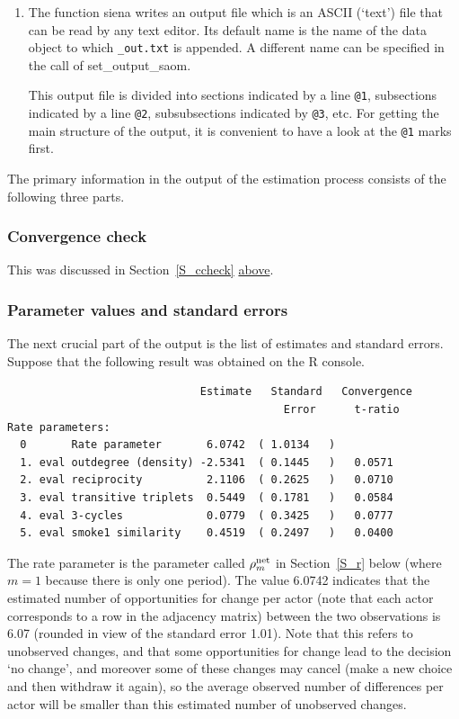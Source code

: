 \documentclass[a4paper,fleqn,11pt]{article}
\newcommand{\+}{\, + \,}
\newcommand{\sfn}[1]{\textsf{#1}}
\newcommand{\R}{{\sf R }}
\begin{document}
\begin{enumerate}
  \item The function \textsf{siena}
        writes an output file which is an ASCII (`text') file that can be
        read by any text editor.
        Its default name is the name of the data object
         to which \texttt{\_out.txt} is appended. A different name
        can be specified in the call of \textsf{\sfn{set\_output\_saom}}.

        This output file is divided into sections
        indicated by a line {\tt @1},
        subsections indicated by a line {\tt @2}, subsubsections indicated
        by {\tt @3}, etc. For getting the main structure of the output, it
        is convenient to have a look at the {\tt @1} marks first.
\end{enumerate}

The primary information in the output of the estimation process
consists of the following three parts.

\subsubsection{Convergence check}

This was discussed in Section~\ref{S_ccheck} \hyperlink{T_convergence}{above}.
\medskip

\subsubsection{Parameter values and standard errors}

The next crucial part of the output is the list of estimates and
standard errors. Suppose that the
following result was obtained on the \R console.

{\footnotesize
\begin{verbatim}
                              Estimate   Standard   Convergence
                                           Error      t-ratio
Rate parameters:
  0       Rate parameter       6.0742  ( 1.0134   )
  1. eval outdegree (density) -2.5341  ( 0.1445   )   0.0571
  2. eval reciprocity          2.1106  ( 0.2625   )   0.0710
  3. eval transitive triplets  0.5449  ( 0.1781   )   0.0584
  4. eval 3-cycles             0.0779  ( 0.3425   )   0.0777
  5. eval smoke1 similarity    0.4519  ( 0.2497   )   0.0400
\end{verbatim}
}

The rate parameter is the parameter called $ \rho^{\rm net}_m$
in Section~\ref{S_r} below (where $m=1$ because there is only one period).
The value 6.0742 indicates
that the estimated number of opportunities
for change per actor (note that each actor
corresponds to a row in the adjacency matrix)
between the two observations is
6.07 (rounded in view of the standard error 1.01). Note that this
refers to unobserved changes, and that some
opportunities for change lead to the decision `no change',
and moreover some of these changes may
cancel (make a new choice and then withdraw it again), so the
average observed number of differences per actor will be
smaller than this estimated number of unobserved changes.
\end{document}
